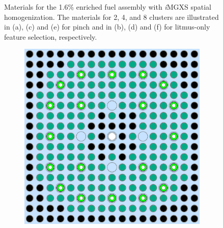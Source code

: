 \begin{figure}[h!]
\begin{subfigure}{0.47\textwidth}
  \caption{}
  \label{fig:chap10-assm-16-combined-8}
\end{subfigure}
\caption[Materials for the 1.6\% fuel assembly with \textit{i}\ac{MGXS} homogenization]{Materials for the 1.6\% enriched fuel assembly with \textit{i}\ac{MGXS} spatial homogenization. The materials for 2, 4, and 8 clusters are illustrated in (a), (c) and (e) for pinch and in (b), (d) and (f) for litmus-only feature selection, respectively.}
\label{fig:chap10-assm-16-geometries}
\end{figure}

\clearpage

\begin{figure}[h!]
\centering
\begin{subfigure}{0.47\textwidth}
  \centering
  \includegraphics[width=0.9\linewidth]{figures/unsupervised/geometries/with-features/2-clusters/pinch/assm-31-20BPs}
  \caption{}
  \label{fig:chap10-assm-31-20BPs-pinch-2}
\end{subfigure}%
\begin{subfigure}{0.47\textwidth}
  \centering

\end{subfigure}
\end{figure}
